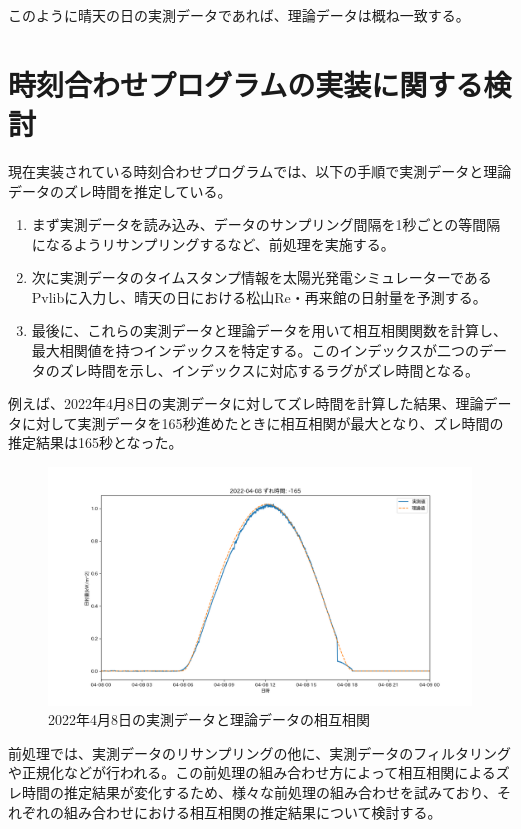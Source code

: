 \documentclass[a4j,12pt,]{jarticle}
\begin{document}
このように晴天の日の実測データであれば、理論データは概ね一致する。

\section{時刻合わせプログラムの実装に関する検討}
現在実装されている時刻合わせプログラムでは、以下の手順で実測データと理論データのズレ時間を推定している。

\begin{enumerate}
\item まず実測データを読み込み、データのサンプリング間隔を1秒ごとの等間隔になるようリサンプリングするなど、前処理を実施する。
\item 次に実測データのタイムスタンプ情報を太陽光発電シミュレーターであるPvlibに入力し、晴天の日における松山Re・再来館の日射量を予測する。
\item 最後に、これらの実測データと理論データを用いて相互相関関数を計算し、最大相関値を持つインデックスを特定する。このインデックスが二つのデータのズレ時間を示し、インデックスに対応するラグがズレ時間となる。
\end{enumerate}

例えば、2022年4月8日の実測データに対してズレ時間を計算した結果、理論データに対して実測データを165秒進めたときに相互相関が最大となり、ズレ時間の推定結果は165秒となった。

\begin{figure}[H]
  \begin{center}
    \includegraphics[width=160mm]{5.png}
    \caption{2022年4月8日の実測データと理論データの相互相関}
    \label{p5}
  \end{center}
\end{figure}

前処理では、実測データのリサンプリングの他に、実測データのフィルタリングや正規化などが行われる。この前処理の組み合わせ方によって相互相関によるズレ時間の推定結果が変化するため、様々な前処理の組み合わせを試みており、それぞれの組み合わせにおける相互相関の推定結果について検討する。
\end{document}
